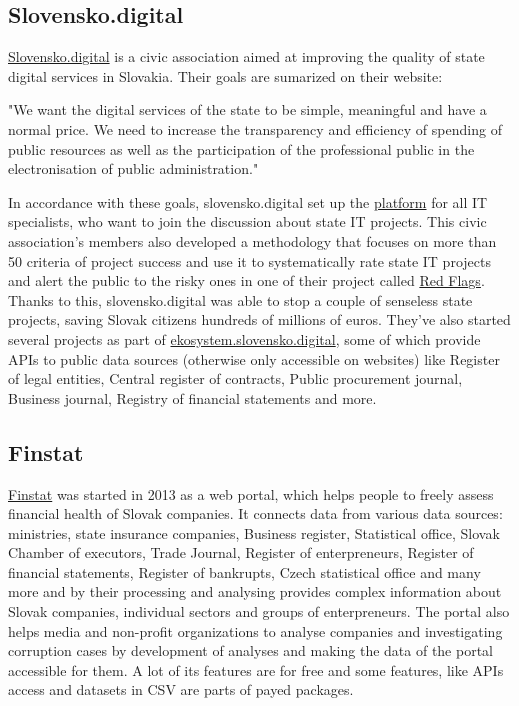 \documentclass[thesis=B,english]{FITthesis}[2012/06/26]
\begin{document}
	\subsection{Slovensko.digital}
	\label{slovensko.digital}
	\href{https://slovensko.digital}{Slovensko.digital} is a civic association aimed at improving the quality of state digital services in Slovakia. 
	Their goals are sumarized on their website:
	\begin{displayquote}
		"We want the digital services of the state to be simple, meaningful and have a normal price. We need to increase the transparency and efficiency of spending of public resources as well as the participation of the professional public in the electronisation of public administration."
	\end{displayquote}
	In accordance with these goals, slovensko.digital set up the \href{https://platforma.slovensko.digital}{platform} for all IT specialists, who want to join the discussion about state IT projects. This civic association's members also developed a methodology that focuses on more than 50 criteria of project success and use it to systematically rate state IT projects and alert the public to the risky ones in one of their project called \href{https://redflags.slovensko.digital/}{Red Flags}. Thanks to this, slovensko.digital was able to stop a couple of senseless state projects, saving Slovak citizens hundreds of millions of euros. They've also started several projects as part of \href{https://ekosystem.slovensko.digital/}{ekosystem.slovensko.digital}, some of which provide APIs to public data sources (otherwise only accessible on websites) like Register of legal entities, Central register of contracts, Public procurement journal, Business journal, Registry of financial statements and more. 
	\subsection{Finstat}
	\label{finstat}
	\href{https://finstat.sk/}{Finstat} was started in 2013 as a web portal, which helps people to freely assess financial health of Slovak companies. It connects data from various data sources: ministries, state insurance companies, Business register, Statistical office, Slovak Chamber of executors, Trade Journal, Register of enterpreneurs, Register of financial statements, Register of bankrupts, Czech statistical office and many more and by their processing and analysing provides complex information about Slovak companies, individual sectors and groups of enterpreneurs. The portal also helps media and non-profit organizations to analyse companies and investigating corruption cases by development of analyses and making the data of the portal accessible for them. A lot of its features are for free and some features, like APIs access and datasets in CSV are parts of payed packages.
\end{document}
